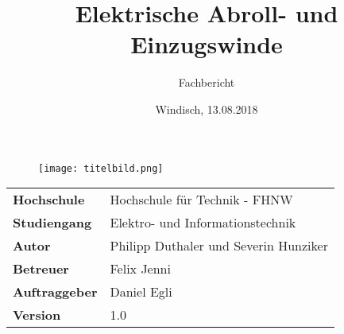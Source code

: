 \documentclass[final]{fhnwreport}       %
\title{Elektrische Abroll- und Einzugswinde}          %
\author{Fachbericht}          %
\date{Windisch, 13.08.2018}             %
\begin{document}
\maketitle

\vspace*{-1cm}						    %
\vfill
\begin{figure}[H]
\centering
\texttt{[image: titelbild.png]}
\end{figure}
\vfill

{
\renewcommand\arraystretch{2}
\begin{center}
\begin{tabular}{>{\bf}p{4cm} l}
Hochschule                 &    Hochschule für Technik - FHNW\\
Studiengang                &    Elektro- und Informationstechnik\\
Autor   		           & 	Philipp Duthaler und Severin Hunziker\\
Betreuer                   &    Felix Jenni\\
Auftraggeber               &    Daniel Egli\\
Version                    &    1.0 %
\end{tabular}
\end{center}
}

\clearpage
			
\thispagestyle{empty}


\tableofcontents
\clearpage




%





{\sloppypar
}



{%
}
\end{document}
